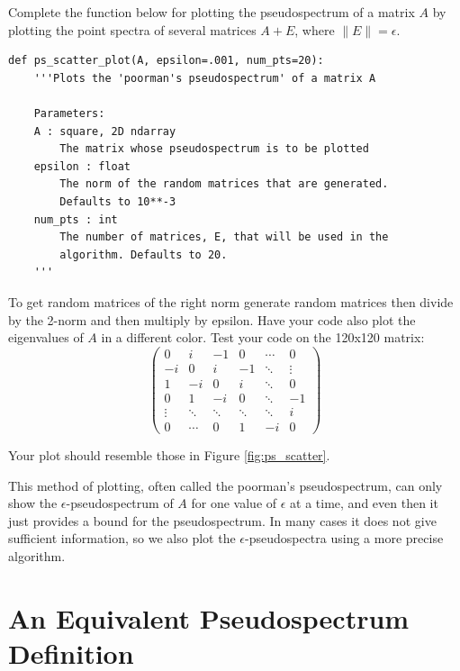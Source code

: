 \begin{problem}
Complete the function below for plotting the pseudospectrum of a matrix $A$ by plotting the point spectra of several matrices $A+E$, where $\lVert E \rVert = \epsilon$. 

\begin{lstlisting}
def ps_scatter_plot(A, epsilon=.001, num_pts=20):
    '''Plots the 'poorman's pseudospectrum' of a matrix A
    
    Parameters:
    A : square, 2D ndarray
        The matrix whose pseudospectrum is to be plotted
    epsilon : float
        The norm of the random matrices that are generated.
        Defaults to 10**-3
    num_pts : int
        The number of matrices, E, that will be used in the
        algorithm. Defaults to 20.       
    '''
\end{lstlisting}

To get random matrices of the right norm generate random matrices then divide by the 2-norm and then multiply by epsilon.
Have your code also plot the eigenvalues of $A$ in a different color. Test your code on the 120x120 matrix:
\begin{equation}
	\begin{pmatrix}
		0  &  i  &  -1  &  0  & \cdots  &  0  \\
		-i &  0  &   i  & -1 & \ddots  &  \vdots  \\
		1  & -i  &   0  &  i &\ddots&  0  \\
		0   & 1 & -i & 0 &\ddots& -1\\
		\vdots   & \ddots    & \ddots & \ddots &\ddots & i\\
		 0  &  \cdots     &   0     &    1  &   -i  & 0
		\end{pmatrix}
\end{equation}

Your plot should resemble those in Figure \ref{fig:ps_scatter}.
\end{problem}

This method of plotting, often called the poorman's pseudospectrum, can only show the $\epsilon$-pseudospectrum of $A$ for one value of $\epsilon$ at a time, and even then it just provides a bound for the pseudospectrum. In many cases it does not give sufficient information, so we also plot the $\epsilon$-pseudospectra using a more precise algorithm.

\section*{An Equivalent Pseudospectrum Definition}


